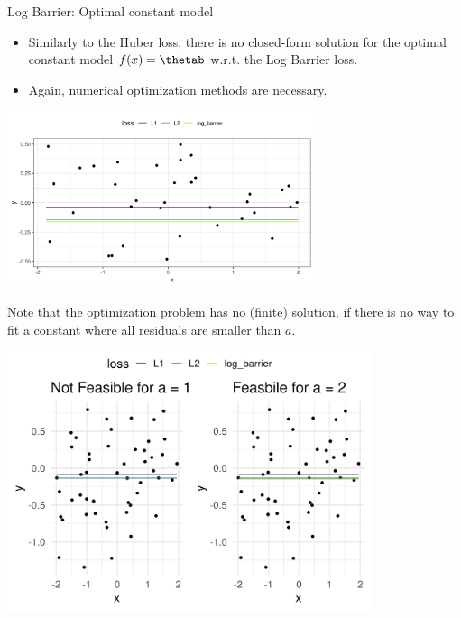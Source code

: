 \begin{vbframe}{Log Barrier: Optimal constant model}

\begin{itemize}
 \item Similarly to the Huber loss, there is no closed-form solution for the optimal constant model $\fx = \thetab$ w.r.t. the Log Barrier loss. 
 \item Again, numerical optimization methods are necessary. 
\end{itemize}

\vspace{0.2cm}

\begin{center}
\includegraphics[width = 9cm ]{figure_man/log_barrier2.png} \\
\end{center}


\framebreak 


Note that the optimization problem has no (finite) solution, if there is no way to fit a constant where all residuals are smaller than $a$. 

\vspace{- 0.2cm}


\begin{center}
\includegraphics[width = 0.8\textwidth]{figure_man/log_barrier_2_1.png} \\
\end{center}


\end{vbframe}

